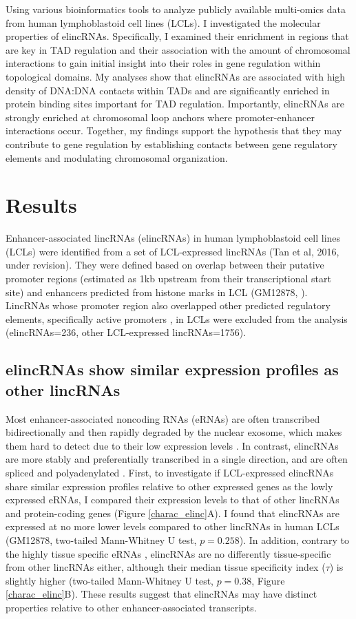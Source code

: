 \documentclass[11pt,a4paper]{report}
\begin{document}
Using various bioinformatics tools to analyze publicly available multi-omics data from human lymphoblastoid cell lines (LCLs). I investigated the molecular properties of elincRNAs. Specifically, I examined their enrichment in regions that are key in TAD regulation and their association with the amount of chromosomal interactions to gain initial insight into their roles in gene regulation within topological domains. My analyses show that elincRNAs are associated with high density of DNA:DNA contacts within TADs and are significantly enriched in protein binding sites important for TAD regulation. Importantly, elincRNAs are strongly enriched at chromosomal loop anchors where promoter-enhancer interactions occur. Together, my findings support the hypothesis that they may contribute to gene regulation by establishing contacts between gene regulatory elements and modulating chromosomal organization.

\section*{Results}

Enhancer-associated lincRNAs (elincRNAs) in human lymphoblastoid cell lines (LCLs) were identified from a set of LCL-expressed lincRNAs (Tan et al, 2016, under revision). They were defined based on overlap between their putative promoter regions (estimated as 1kb upstream from their transcriptional start site) and enhancers predicted from histone marks in LCL (GM12878, \cite{ENCODEProject2012}⁠). LincRNAs whose promoter region also overlapped other predicted regulatory elements, specifically active promoters \cite{ENCODEProject2012}⁠, in LCLs were excluded from the analysis (elincRNAs=236, other LCL-expressed lincRNAs=1756).

\subsection*{elincRNAs show similar expression profiles as other lincRNAs}

Most enhancer-associated noncoding RNAs (eRNAs) are often transcribed bidirectionally and then rapidly degraded by the nuclear exosome, which makes them hard to detect due to their low expression levels \cite{Darrow2013} \cite{Lam2014}⁠. In contrast, elincRNAs are more stably and preferentially transcribed in a single direction, and are often spliced and polyadenylated \cite{Marques2013a}⁠. 
First, to investigate if LCL-expressed elincRNAs share similar expression profiles relative to other expressed genes as the lowly expressed eRNAs, I compared  their expression levels to that of other lincRNAs and protein-coding genes (Figure \ref{charac_elinc}A). I found that elincRNAs are expressed at no more lower levels compared to other lincRNAs in human LCLs (GM12878, two-tailed Mann-Whitney U test, $p=0.258$). In addition, contrary to the highly tissue specific eRNAs \cite{Wu2014}, elincRNAs are no differently tissue-specific from other lincRNAs either, although their median tissue specificity index ($\tau$) is slightly higher (two-tailed Mann-Whitney U test, $p=0.38$, Figure \ref{charac_elinc}B). These results suggest that elincRNAs may have distinct properties relative to other enhancer-associated transcripts.
\end{document}
